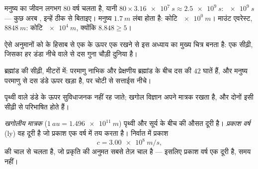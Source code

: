 \begin{example}[परिमाण की कोटियाँ]\label{ex:g10:orders-of-magnitude:oom}
मनुष्य का जीवन लगभग $80$ वर्ष चलता है, यानी $80 \times \qty{3.16e7}{s} \approx \qty{2.5e9}{s}$:  $\qty{e9}{s}$ --- कुछ अरब , इन्हें ठीक से बिताइए। मनुष्य $\qty{1.7}{m}$
लंबा होता है: कोटि $\qty{e0}{m}$। माउंट एवरेस्ट, $\qty{8848}{m}$: कोटि $\qty{e4}{m}$,
क्योंकि $8.848 \geq 5$।
\end{example}

ऐसे अनुमानों को  के हिसाब से एक के ऊपर एक रखने से इस
अध्याय का मुख्य चित्र बनता है: एक सीढ़ी, जिसका हर डंडा नीचे वाले से दस
गुना चौड़ी दुनिया है।

\begin{omfigure}

{\small ब्रह्मांड की सीढ़ी, मीटरों में: परमाणु नाभिक और
प्रेक्षणीय ब्रह्मांड के बीच दस की $42$ घातें हैं, और मनुष्य परमाणु
से दस डंडे ऊपर खड़ा है, पर चोटी से सत्ताईस नीचे।}
\end{omfigure}

पृथ्वी वाले डंडे के ऊपर  सुविधाजनक नहीं रह जाते; खगोल
विज्ञान अपने मात्रक रखता है, और दोनों इसी सीढ़ी से परिभाषित
होते हैं।

\begin{definition}[खगोलीय मात्रक और प्रकाश वर्ष]\label{def:g10:orders-of-magnitude:lightyear}
\emph{खगोलीय मात्रक} ($\qty{1}{au} = \qty{1.496e11}{m}$) पृथ्वी और सूर्य के
बीच की औसत दूरी है। \emph{प्रकाश वर्ष} (\unit{ly}) वह
दूरी है जो प्रकाश एक वर्ष में तय करता है। निर्वात में प्रकाश
\[
c = \qty{3.00e8}{m/s},
\]
की चाल से चलता है, जो प्रकृति की अनुमत सबसे तेज़ चाल है --- इसलिए
प्रकाश वर्ष एक दूरी है, समय नहीं।
\end{definition}

